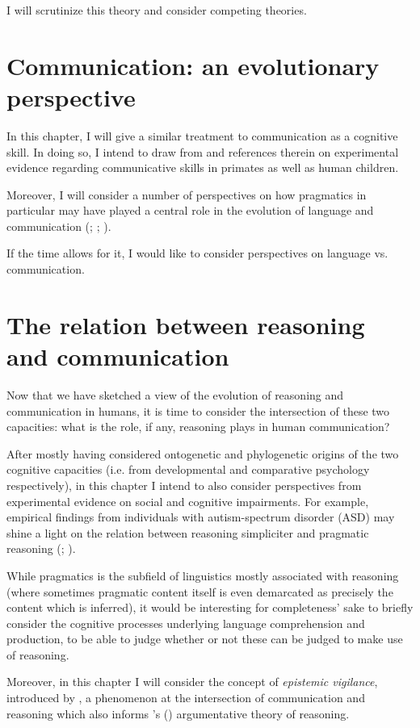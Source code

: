 \documentclass{article}
\newcommand{\poscite}[1]{\citeauthor{#1}'s (\citeyear{#1})}
\begin{document}
I will scrutinize this theory and consider competing theories.

\section{Communication: an evolutionary perspective}

In this chapter, I will give a similar treatment to communication as a cognitive skill. In doing so, I intend to draw from \citet{Tomasello08-origins} and references therein on experimental evidence regarding communicative skills in primates as well as human children.

Moreover, I will consider a number of perspectives on how pragmatics in particular may have played a central role in the evolution of language and communication (\citet{Benitez21}; \citet{Moore17}; \cite{Scott-Phillips17-pragmatics}).

If the time allows for it, I would like to consider perspectives on language vs. communication.

\section{The relation between reasoning and communication}

Now that we have sketched a view of the evolution of reasoning and communication in humans, it is time to consider the intersection of these two capacities: what is the role, if any, reasoning plays in human communication?

After mostly having considered ontogenetic and phylogenetic origins of the two cognitive capacities (i.e. from developmental and comparative psychology respectively), in this chapter I intend to also consider perspectives from experimental evidence on social and cognitive impairments. For example, empirical findings from individuals with autism-spectrum disorder (ASD) may shine a light on the relation between reasoning simpliciter and pragmatic reasoning (\citet{Geurts19}; \citet{Brosnan16}).

While pragmatics is the subfield of linguistics mostly associated with reasoning (where sometimes pragmatic content itself is even demarcated as precisely the content which is inferred), it would be interesting for completeness' sake to briefly consider the cognitive processes underlying language comprehension and production, to be able to judge whether or not these can be judged to make use of reasoning.

Moreover, in this chapter I will consider the concept of \emph{epistemic vigilance}, introduced by \citet{Sperber10}, a phenomenon at the intersection of communication and reasoning which also informs \poscite{MS11} argumentative theory of reasoning.
\end{document}
